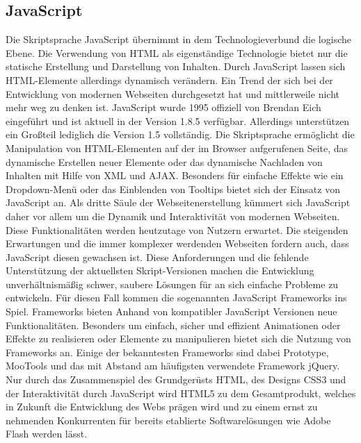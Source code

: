 \subsection{JavaScript}
Die Skriptsprache JavaScript übernimmt in dem Technologieverbund die logische
Ebene. Die Verwendung von HTML als eigenständige Technologie bietet nur die
statische Erstellung und Darstellung von Inhalten. Durch JavaScript lassen
sich HTML-Elemente allerdings dynamisch verändern. Ein Trend der sich bei
der Entwicklung von modernen Webseiten durchgesetzt hat und mittlerweile
nicht mehr weg zu denken ist. JavaScript wurde 1995 offiziell von Brendan Eich
eingeführt und ist aktuell in der Version 1.8.5 verfügbar. Allerdings
unterstützen ein Großteil lediglich die Version 1.5 vollständig.
\newline\newline
Die Skriptsprache ermöglicht die Manipulation von HTML-Elementen auf der
im Browser aufgerufenen Seite, das dynamische Erstellen neuer Elemente oder
das dynamische Nachladen von Inhalten mit Hilfe von XML und AJAX. Besonders
für einfache Effekte wie ein Dropdown-Menü oder das Einblenden von Tooltips
bietet sich der Einsatz von JavaScript an.
\newline\newline
Als dritte Säule der Webseitenerstellung kümmert sich JavaScript daher vor
allem um die Dynamik und Interaktivität von modernen Webseiten. Diese
Funktionalitäten werden heutzutage von Nutzern erwartet. Die steigenden
Erwartungen und die immer komplexer werdenden Webseiten fordern auch, dass
JavaScript diesen gewachsen ist. Diese Anforderungen und die fehlende
Unterstützung der aktuellsten Skript-Versionen machen die Entwicklung
unverhältnismäßig schwer, saubere Lösungen für an sich einfache Probleme zu
entwickeln. Für diesen Fall kommen die sogenannten JavaScript Frameworks ins
Spiel. Frameworks bieten Anhand von kompatibler JavaScript Versionen neue
Funktionalitäten. Besonders um einfach, sicher und effizient Animationen oder
Effekte zu realisieren oder Elemente zu manipulieren bietet sich die Nutzung
von Frameworks an. Einige der bekanntesten Frameworks sind dabei Prototype,
MooTools und das mit Abstand am häufigsten verwendete Framework jQuery.
\newline\newline
Nur durch das Zusammenspiel des Grundgerüsts HTML, des Designs CSS3 und der
Interaktivität durch JavaScript wird HTML5 zu dem Gesamtprodukt, welches in
Zukunft die Entwicklung des Webs prägen wird und zu einem ernst zu nehmenden
Konkurrenten für bereits etablierte Softwarelösungen wie Adobe Flash werden
lässt.

